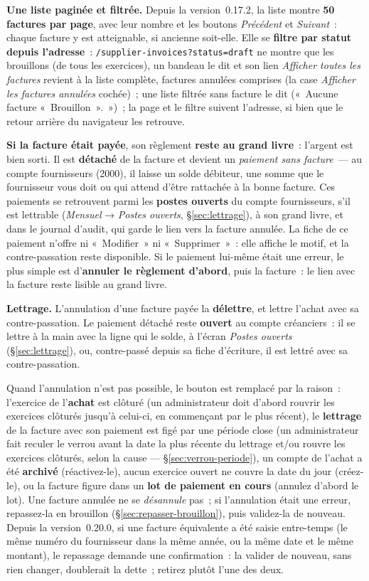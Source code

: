 \documentclass[a4paper,11pt,oneside]{article}
\begin{document}
\textbf{Une liste paginée et filtrée.} Depuis la version~0.17.2, la liste montre
\textbf{50 factures par page}, avec leur nombre et les boutons \emph{Précédent} et \emph{Suivant}~:
chaque facture y est atteignable, si ancienne soit-elle. Elle se \textbf{filtre par statut depuis
l'adresse}~: \texttt{/supplier-invoices?status=draft} ne montre que les brouillons (de tous les
exercices), un bandeau le dit et son lien \emph{Afficher toutes les factures} revient à la liste
complète, factures annulées comprises (la case \emph{Afficher les factures annulées} cochée)~;
une liste filtrée sans facture le dit («~Aucune facture «~Brouillon~».~»)~; la page et le filtre suivent l'adresse, si bien que le retour arrière du navigateur les
retrouve.

\textbf{Si la facture était payée}, son règlement \textbf{reste au grand livre}~: l'argent est
bien sorti. Il est \textbf{détaché} de la facture et devient un \emph{paiement sans facture}~---
au compte fournisseurs (2000), il laisse un solde débiteur, une somme que le fournisseur vous
doit ou qui attend d'être rattachée à la bonne facture. Ces paiements se retrouvent parmi les
\textbf{postes ouverts} du compte fournisseurs, s'il est lettrable (\emph{Mensuel} →
\emph{Postes ouverts}, \S\ref{sec:lettrage}), à son grand livre, et dans le journal d'audit, qui garde le lien vers
la facture annulée. La fiche de ce paiement n'offre ni «~Modifier~» ni «~Supprimer~»~: elle affiche le motif, et la contre-passation reste disponible. Si le paiement lui-même était une erreur, le plus simple est d'\textbf{annuler le
règlement d'abord}, puis la facture~: le lien avec la facture reste lisible au grand livre.

\textbf{Lettrage.} L'annulation d'une facture payée la \textbf{délettre}, et lettre l'achat avec
sa contre-passation. Le paiement détaché reste \textbf{ouvert} au compte créanciers~: il se
lettre à la main avec la ligne qui le solde, à l'écran \emph{Postes ouverts}
(\S\ref{sec:lettrage}), ou, contre-passé depuis sa fiche d'écriture, il est lettré
avec sa contre-passation.

Quand l'annulation n'est pas possible, le bouton est remplacé par la raison~: l'exercice de
l'\textbf{achat} est clôturé (un administrateur doit d'abord rouvrir les exercices clôturés
jusqu'à celui-ci, en commençant par le plus récent), le \textbf{lettrage} de la facture avec
son paiement est figé par une période close (un administrateur fait reculer le verrou avant la
date la plus récente du lettrage et/ou rouvre les exercices clôturés, selon la cause ---
\S\ref{sec:verrou-periode}), un compte de l'achat
a été \textbf{archivé} (réactivez-le), aucun exercice ouvert ne couvre la date du jour
(créez-le), ou la facture figure dans un \textbf{lot de paiement en cours} (annulez d'abord le
lot). Une facture annulée ne se \emph{désannule} pas~; si l'annulation était une erreur,
repassez-la en brouillon (\S\ref{sec:repasser-brouillon}), puis validez-la de nouveau. Depuis
la version~0.20.0, si une facture équivalente a été saisie entre-temps (le même numéro du
fournisseur dans la même année, ou la même date et le même montant), le repassage demande une
confirmation~: la valider de nouveau, sans rien changer, doublerait la dette~; retirez plutôt
l'une des deux.
\end{document}
